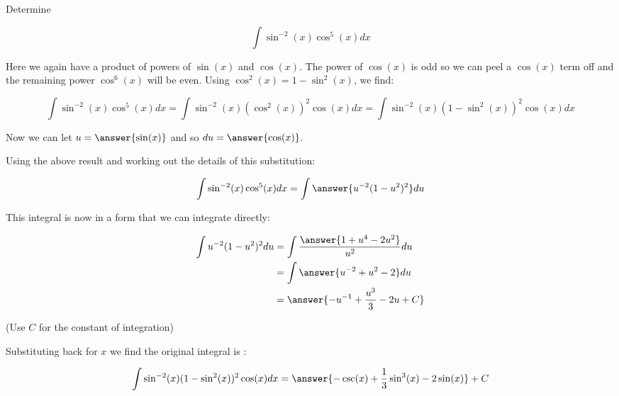 \documentclass{ximera}
\author{Jason Miller and Bart Snapp}
\begin{document}
\begin{exercise}
Determine 

\[
\int \sin^{-2}(x)\cos^{5}(x) dx
\]

Here we again have a product of powers of $\sin(x)$ and $\cos(x)$. The power of $\cos(x)$ is odd so we can peel a $\cos(x)$ term off and the remaining power $\cos^{6}(x)$ will be even. Using $\cos^{2}(x)=1-\sin^{2}(x)$, we find:

\[
\int \sin^{-2}(x)\cos^{5}(x) dx = \int \sin^{-2}(x) (\cos^2(x))^{2} \cos(x) dx =\int \sin^{-2}(x) (1-\sin^{2}(x))^{2} \cos(x) dx 
\]

Now we can let $u=\answer{\sin(x)}$ and so $du= \answer{\cos(x)}$. 

\begin{exercise}
Using the above result and working out the details of this substitution:

\[
\int \sin^{-2}(x)\cos^{5}(x) dx = \int \answer{u^{-2}(1-u^{2})^{2}} du
\]

\begin{exercise}
This integral is now in a form that we can integrate directly: 

\begin{align*}
\int u^{-2}(1-u^{2})^{2} du &=\int \frac{\answer{1+u^{4}-2u^{2}}}{u^{2}} du \\
&= \int \answer{u^{-2}+u^{2} -2} du \\
&=\answer{-u^{-1}+\frac{u^{3}}{3} -2u + C}
\end{align*}

(Use $C$ for the constant of integration)
\begin{exercise}

Substituting back for $x$ we find the original integral is :

\[
\int \sin^{-2}(x) ( 1- \sin^{2}(x))^{2} \cos(x) dx= \answer{-\csc(x)+ \frac{1}{3} \sin^{3}(x) -2 \sin(x)} +C
\]

\end{exercise}
\end{exercise}
\end{exercise}
\end{exercise}
\end{document}
